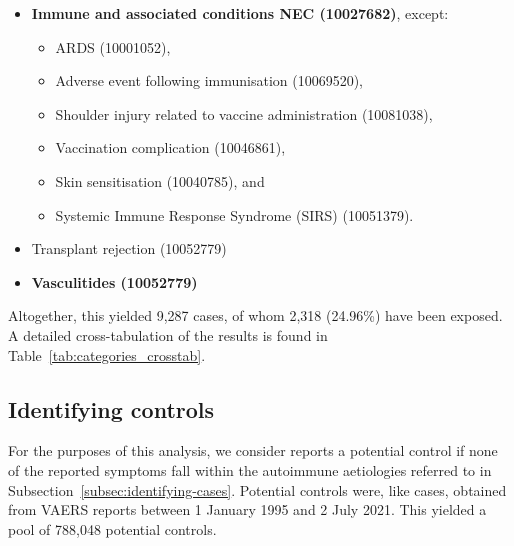 \documentclass{article}
\begin{document}
\begin{itemize}
\begin{itemize}
\begin{itemize}
                                                        \item \textbf{Immune and associated conditions NEC (10027682)}, except: \begin{itemize}
                                                                                                                                    \item ARDS (10001052),
                                                                                                                                    \item Adverse event following immunisation (10069520),
                                                                                                                                    \item Shoulder injury related to vaccine administration (10081038),
                                                                                                                                    \item Vaccination complication (10046861),
                                                                                                                                    \item Skin sensitisation (10040785), and
                                                                                                                                    \item Systemic Immune Response Syndrome (SIRS) (10051379).
                                                        \end{itemize}
                                                        \item Transplant rejection (10052779)
                                                        \item \textbf{Vasculitides (10052779)}
              \end{itemize}
    \end{itemize}
\end{itemize}

Altogether, this yielded 9,287 cases, of whom 2,318 (24.96\%) have been exposed. A detailed cross-tabulation of the results is found in Table~\ref{tab:categories_crosstab}.

\subsection{Identifying controls}

For the purposes of this analysis, we consider reports a potential control if none of the reported symptoms fall within the autoimmune aetiologies referred to in Subsection~\ref{subsec:identifying-cases}.
Potential controls were, like cases, obtained from VAERS reports between 1 January 1995 and 2 July 2021.
This yielded a pool of 788,048 potential controls.
\end{document}
